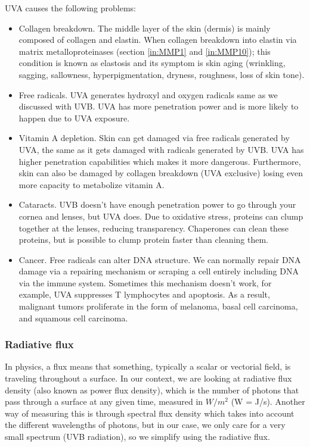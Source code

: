 UVA causes the following problems:

\begin{itemize}

\item Collagen breakdown. The middle layer of the skin (dermis) is mainly composed of collagen and elastin. When collagen breakdown into elastin via matrix metalloproteinases (section \ref{in:MMP1} and \ref{in:MMP10}); this condition is known as elastosis and its symptom is skin aging (wrinkling, sagging, sallowness, hyperpigmentation, dryness, roughness, loss of skin tone).

\item Free radicals. UVA generates hydroxyl and oxygen radicals same as we discussed with UVB. UVA has more penetration power and is more likely to happen due to UVA exposure.

\item Vitamin A depletion. Skin can get damaged via free radicals generated by UVA, the same as it gets damaged with radicals generated by UVB. UVA has higher penetration capabilities which makes it more dangerous. Furthermore, skin can also be damaged by collagen breakdown (UVA exclusive) losing even more capacity to metabolize vitamin A.

\item Cataracts. UVB doesn't have enough penetration power to go through your cornea and lenses, but UVA does. Due to oxidative stress, proteins can clump together at the lenses, reducing transparency. Chaperones can clean these proteins, but is possible to clump protein faster than cleaning them.

\item Cancer. Free radicals can alter DNA structure. We can normally repair DNA damage via a repairing mechanism or scraping a cell entirely including DNA via the immune system. Sometimes this mechanism doesn't work, for example, UVA suppresses T lymphocytes and apoptosis. As a result, malignant tumors proliferate in the form of melanoma, basal cell carcinoma, and squamous cell carcinoma.   

\end{itemize}

\subsubsection{Radiative flux}

In physics, a flux means that something, typically a scalar or vectorial field, is traveling throughout a surface. In our context, we are looking at radiative flux density (also known as power flux density), which is the number of photons that pass through a surface at any given time, measured in $W/m^2$ (W = J/s). Another way of measuring this is through spectral flux density which takes into account the different wavelengths of photons, but in our case, we only care for a very small spectrum (UVB radiation), so we simplify using the radiative flux.

